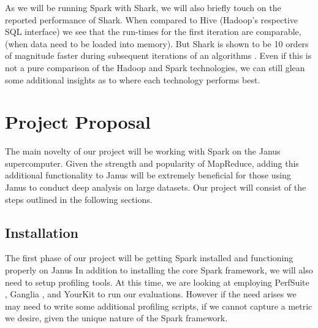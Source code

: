 \documentclass{article}
\begin{document}





As we will be running Spark with Shark, we will also briefly touch on the
reported performance of Shark. When compared to Hive (Hadoop's respective
SQL interface) we see that the run-times for the first iteration are comparable,
(when data need to be loaded into memory). But Shark is shown to be 10 orders
of magnitude faster during subsequent iterations of an algorithms \citep{engle}.
Even if this is not a pure comparison of the Hadoop and Spark technologies, we
can still glean some additional insights as to where each technology performs
best.


\section*{Project Proposal}
The main novelty of our project will be working with Spark on the Janus
supercomputer. Given the strength and popularity of MapReduce, adding this
additional functionality to Janus will be extremely beneficial for those using
Janus to conduct deep analysis on large datasets. Our project will consist of
the steps outlined in the following sections.

\subsection*{Installation}
The first phase of our project will be getting Spark installed and functioning
properly on Janus In addition to installing the core Spark framework, we will
also need to setup profiling tools. At this time, we are looking at employing
PerfSuite \citep{perfsuite}, Ganglia \citep{ganglia}, and YourKit
\citep{yourkit} to run our evaluations. However if the need arises we may
need to write some additional profiling scripts, if we cannot capture a metric
we desire, given the unique nature of the Spark framework.
\end{document}
